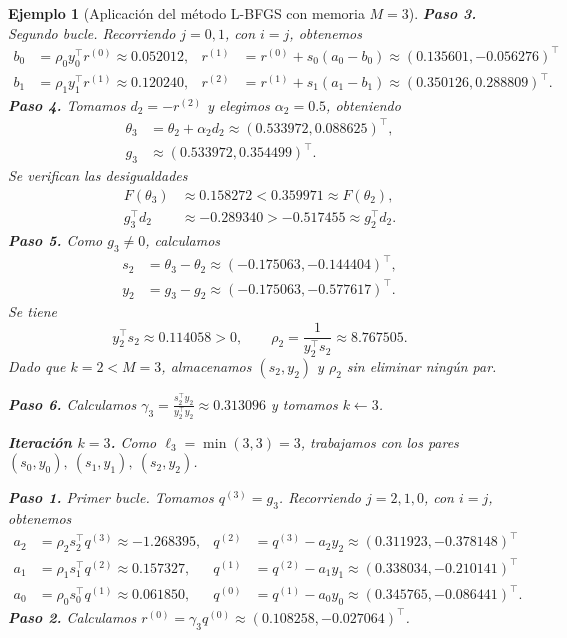 \documentclass[a4paper,openany,oneside,10pt]{report}
\theoremstyle{pnlTeorema}
\theoremstyle{pnlDefinicion}
\theoremstyle{pnlObservacion}
\newtheorem{ejemplo}{Ejemplo}[section]
\begin{document}
\begin{ejemplo}[Aplicación del método L-BFGS con memoria $M=3$]
\noindent\textbf{Paso 3.} Segundo bucle. Recorriendo $j=0,1$, con $i=j$, obtenemos
\[
\begin{aligned}
    b_0&=\rho_0y_0^\top r^{(0)}\approx 0.052012, & r^{(1)}&=r^{(0)}+s_0(a_0-b_0)\approx (0.135601,-0.056276)^\top\\
    b_1&=\rho_1y_1^\top r^{(1)}\approx 0.120240, & r^{(2)}&=r^{(1)}+s_1(a_1-b_1)\approx (0.350126,0.288809)^\top.
\end{aligned}
\]
\noindent\textbf{Paso 4.} Tomamos $d_2=-r^{(2)}$ y elegimos $\alpha_2=0.5$, obteniendo
\[
\begin{aligned}
    \theta_3&=\theta_2+\alpha_2d_2\approx (0.533972,0.088625)^\top,\\
    g_3&\approx (0.533972,0.354499)^\top.
\end{aligned}
\]
Se verifican las desigualdades
\[
\begin{aligned}
    F(\theta_3)&\approx 0.158272<0.359971\approx F(\theta_2),\\
    g_3^\top d_2&\approx -0.289340>-0.517455\approx g_2^\top d_2.
\end{aligned}
\]
\noindent\textbf{Paso 5.} Como $g_3\ne0$, calculamos
\[
\begin{aligned}
    s_2&=\theta_3-\theta_2\approx (-0.175063,-0.144404)^\top,\\
    y_2&=g_3-g_2\approx (-0.175063,-0.577617)^\top.
\end{aligned}
\]
Se tiene
\[
    y_2^\top s_2\approx 0.114058>0,\qquad
    \rho_2=\frac{1}{y_2^\top s_2}\approx 8.767505.
\]
Dado que $k=2<M=3$, almacenamos $(s_2,y_2)$ y $\rho_2$ sin eliminar ningún par.

\noindent\textbf{Paso 6.} Calculamos $\gamma_3=\frac{s_2^\top y_2}{y_2^\top y_2}\approx 0.313096$ y tomamos $k\leftarrow3$.

\smallskip
\noindent\textbf{Iteración $k=3$.} Como $\ell_3=\min(3,3)=3$, trabajamos con los pares $(s_0,y_0),\ (s_1,y_1),\ (s_2,y_2)$.

\noindent\textbf{Paso 1.} Primer bucle. Tomamos $q^{(3)}=g_3$. Recorriendo $j=2,1,0$, con $i=j$, obtenemos
\[
\begin{aligned}
    a_2&=\rho_2s_2^\top q^{(3)}\approx -1.268395, & q^{(2)}&=q^{(3)}-a_2y_2\approx (0.311923,-0.378148)^\top\\
    a_1&=\rho_1s_1^\top q^{(2)}\approx 0.157327, & q^{(1)}&=q^{(2)}-a_1y_1\approx (0.338034,-0.210141)^\top\\
    a_0&=\rho_0s_0^\top q^{(1)}\approx 0.061850, & q^{(0)}&=q^{(1)}-a_0y_0\approx (0.345765,-0.086441)^\top.
\end{aligned}
\]
\noindent\textbf{Paso 2.} Calculamos $r^{(0)}=\gamma_3q^{(0)}\approx (0.108258,-0.027064)^\top$.


\end{ejemplo}
\end{document}

